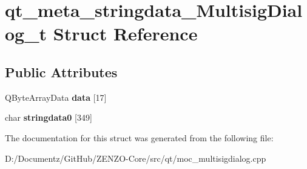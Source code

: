 \hypertarget{structqt__meta__stringdata___multisig_dialog__t}{}\section{qt\+\_\+meta\+\_\+stringdata\+\_\+\+Multisig\+Dialog\+\_\+t Struct Reference}
\label{structqt__meta__stringdata___multisig_dialog__t}
\subsection*{Public Attributes}
\begin{DoxyCompactItemize}
\item 
\mbox{\label{structqt__meta__stringdata___multisig_dialog__t_ab6d88b3bf44fd05a09192242f010f9ae}} 
Q\+Byte\+Array\+Data {\bfseries data} \mbox{[}17\mbox{]}
\item 
\mbox{\label{structqt__meta__stringdata___multisig_dialog__t_a4f4ed4a543473722ae595887264faede}} 
char {\bfseries stringdata0} \mbox{[}349\mbox{]}
\end{DoxyCompactItemize}


The documentation for this struct was generated from the following file\+:\begin{DoxyCompactItemize}
\item 
D\+:/\+Documentz/\+Git\+Hub/\+Z\+E\+N\+Z\+O-\/\+Core/src/qt/moc\+\_\+multisigdialog.\+cpp\end{DoxyCompactItemize}
